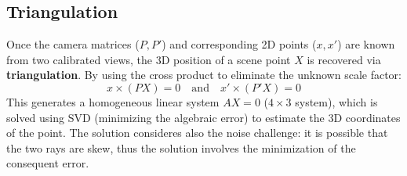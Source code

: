 \subsection{Triangulation}
Once the camera matrices ($P, P'$) and corresponding 2D points ($x, x'$) are known from two calibrated views, the 3D position of a scene point $X$ is recovered via \textbf{triangulation}. By using the cross product to eliminate the unknown scale factor:
\[
  x \times (PX) = 0 \quad \text{and} \quad x' \times (P'X) = 0
\]
This generates a homogeneous linear system $AX = 0$ ($4 \times 3$ system), which is solved using SVD (minimizing the algebraic error) to estimate the 3D coordinates of the point.
The solution consideres also the noise challenge: it is possible that the two rays are skew, thus the solution involves the minimization of the consequent error.